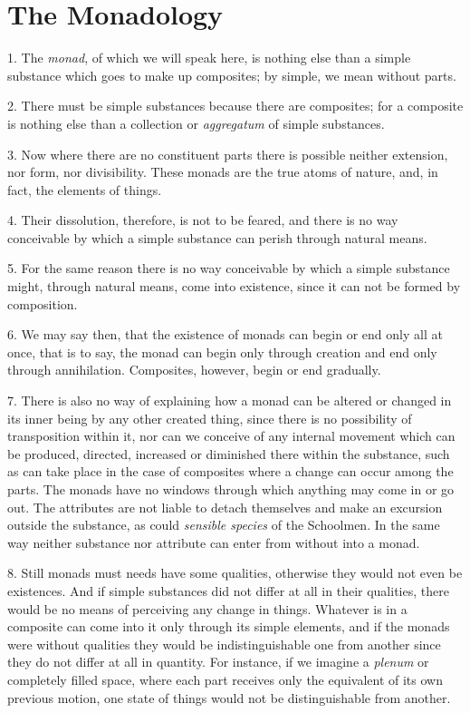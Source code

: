 
\author{G. W. Leibniz}
\chapter{The Monadology}


1. The \textit{monad}, of which we will speak here, is
nothing else than a simple substance which goes to make up composites;
by simple, we mean without parts.

2. There must be simple substances because there are composites; for a
composite is nothing else than a collection or \textit{aggregatum} of
simple substances.

3. Now where there are no constituent parts there is possible neither
extension, nor form, nor divisibility. These monads are the true atoms
of nature, and, in fact, the elements of things.

4. Their dissolution, therefore, is not to be feared, and there is no
way conceivable by which a simple substance can perish through natural
means.

5. For the same reason there is no way conceivable by which a simple
substance might, through natural means, come into existence, since it
can not be formed by composition.


6. We may say then, that the existence of monads can begin or end only
all at once, that is to say, the monad can begin only through creation
and end only through annihilation. Composites, however, begin or end
gradually.

7. There is also no way of explaining how a monad can be altered or
changed in its inner being by any  other created thing,
since there is no possibility of transposition within it, nor can we
conceive of any internal movement which can be produced, directed,
increased or diminished there within the substance, such as can take
place in the case of composites where a change can occur among the
parts. The monads have no windows through which anything may come in
or go out. The attributes are not liable to detach themselves and make
an excursion outside the substance, as could \textit{sensible species}
of the Schoolmen. In the same way neither substance nor attribute can
enter from without into a monad.

8. Still monads must needs have some qualities, otherwise they would
not even be existences. And if simple substances did not differ at all
in their qualities, there would be no means of perceiving any change
in things. Whatever is in a composite can come into it only through
its simple elements, and if the monads were without qualities they would be
indistinguishable one from another since they do not differ at all in
quantity. For instance, if we imagine a \textit{plenum} or completely
filled space, where each part receives only the equivalent of its own
previous motion, one state of things would not be distinguishable from
another.

